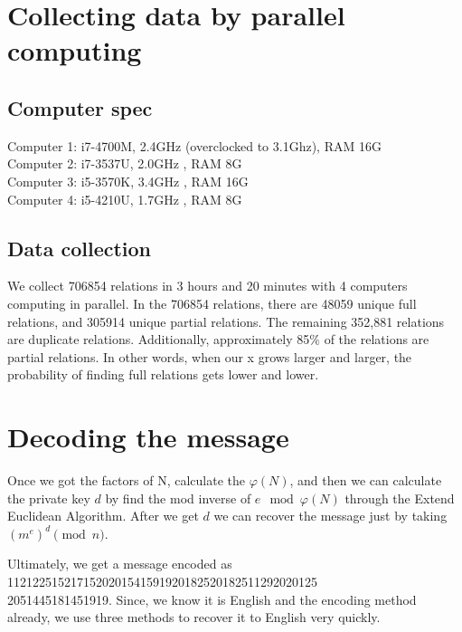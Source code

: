 \documentclass[12pt]{article} %
\begin{document}
	\section {Collecting data by parallel computing} 
	\subsection{Computer spec}
	Computer 1: i7-4700M, 2.4GHz (overclocked to 3.1Ghz), RAM 16G\\
	\indent Computer 2: i7-3537U, 2.0GHz               , RAM 8G\\
	\indent Computer 3: i5-3570K, 3.4GHz               , RAM 16G\\
	\indent Computer 4: i5-4210U, 1.7GHz               , RAM 8G
	
	\subsection{Data collection}
	We collect 706854 relations in 3 hours and 20 minutes with 4 computers computing in parallel. In the 706854 relations, there are 48059 unique full relations, and 305914 unique partial relations. The remaining 352,881 relations are duplicate relations.
	Additionally, approximately 85$\%$ of the relations are partial relations. In other words, when our x grows larger and larger, the probability of finding full relations gets lower and lower.
	
	\section {Decoding the message}
	
	Once we got the factors of N, calculate the $\varphi(N)$, and then we can calculate the private key $d$ by find the mod inverse of $e \mod{\varphi(N)}$ through the Extend Euclidean Algorithm. After we get $d$ we can recover the message just by taking $(m^e)^d \pmod{n}$. 
	
	Ultimately, we get a message encoded as 1121225152171520201541591920182520182511292020125\\2051445181451919. Since, we know it is English and the encoding method already, we use three methods to recover it to English very quickly. 
	
\end{document}
